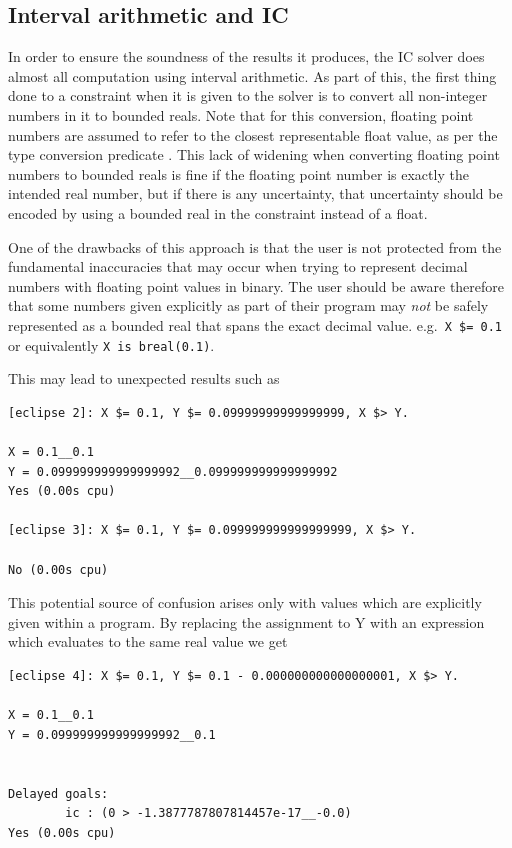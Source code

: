 \subsection{Interval arithmetic and IC}

In order to ensure the soundness of the results it produces, the IC
solver does almost all computation using interval arithmetic.  As part
of this, the first thing done to a constraint when it is given to the
solver is to convert all non-integer numbers in it to bounded reals.
Note that for this conversion, floating point numbers are assumed to
refer to the closest representable float value, as per the type
conversion predicate
.
This lack of widening when converting floating point numbers to
bounded reals is fine if the floating point number is exactly 
the intended real number, but if there is any uncertainty, that 
uncertainty should be encoded by using a bounded real in the 
constraint instead of a float.

One of the drawbacks of this approach is that the user is not
protected from the fundamental inaccuracies that may occur when trying
to represent decimal numbers with floating point values in binary.
The user should be aware therefore that some numbers given explicitly
as part of their program may \emph{not} be safely represented as a
bounded real that spans the exact decimal value. e.g.\
\verb|X $= 0.1| or equivalently \verb|X is breal(0.1)|.

This may lead to unexpected results such as
\begin{verbatim}
[eclipse 2]: X $= 0.1, Y $= 0.09999999999999999, X $> Y.

X = 0.1__0.1
Y = 0.099999999999999992__0.099999999999999992
Yes (0.00s cpu)

[eclipse 3]: X $= 0.1, Y $= 0.099999999999999999, X $> Y.

No (0.00s cpu)
\end{verbatim}

This potential source of confusion arises only with values which are
explicitly given within a program.  By replacing the assignment to Y
with an expression which evaluates to the same real value we get

\begin{verbatim}
[eclipse 4]: X $= 0.1, Y $= 0.1 - 0.000000000000000001, X $> Y.

X = 0.1__0.1
Y = 0.099999999999999992__0.1


Delayed goals:
        ic : (0 > -1.3877787807814457e-17__-0.0)
Yes (0.00s cpu)
\end{verbatim}

